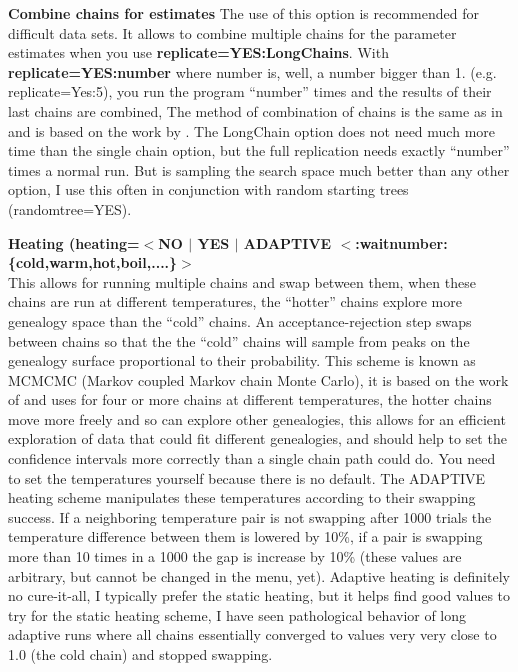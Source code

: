 \begin{description}
\item{\bf Combine chains for estimates}
The use of this option is recommended for difficult
data sets. It allows to combine multiple chains for the parameter 
estimates when you use {\bf replicate=YES:LongChains}. 
With  {\bf replicate=YES:number} where number is, well, 
a number bigger than 1. (e.g. replicate=Yes:5), you run the program ``number'' times and the results of their last chains are combined,
The method of combination of chains is the same as in \cite{kuhner:1995:eep}
and is based on the work by \cite{geyer1991-t}. The LongChain option does not need much more time than the single chain option, but the full replication needs
exactly ``number'' times a normal run. But is sampling the search space
much better than any other option, I use this often in conjunction with
random starting trees (randomtree=YES). 
\item{\bf Heating (\bf heating=$<$NO $|$ YES $|$ ADAPTIVE $<$:waitnumber:\{cold,warm,hot,boil,....\}$>$}\\
This allows for running multiple chains and swap between them, when 
these chains are run at different temperatures, 
the ``hotter'' chains explore more genealogy space than the 
``cold'' chains. An acceptance-rejection
step swaps between chains so that the the ``cold'' chains will sample
from peaks on the genealogy surface proportional to their
probability. This scheme is known as MCMCMC (Markov 
coupled Markov chain Monte Carlo),
it is based on the work of \cite{geyer:1995:amc} and uses for
four or more chains at different temperatures, the hotter chains move more freely
and so can explore other genealogies, this allows for an efficient 
exploration of data that could fit different genealogies, and should help
to set the confidence intervals more correctly than a single chain path 
could do. You need to set the temperatures yourself because there is no default.
The ADAPTIVE heating scheme manipulates these temperatures according to their
swapping success. If a neighboring temperature pair is not swapping after 1000 trials
the temperature difference between them is lowered by 10\%, if a pair is swapping more than
10 times in a 1000 the gap is increase by 10\% (these values are arbitrary, but cannot be changed in the menu, yet).
Adaptive heating is definitely no cure-it-all, I typically prefer the static heating, but it helps find good values to try for the static heating scheme, I have seen pathological behavior of long adaptive runs where all chains essentially converged to values very very close to 1.0 (the cold chain) and stopped swapping. 


\end{description}

